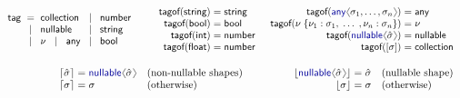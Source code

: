 \documentclass[10pt,preprint,clearpagebib]{sigplanconf}
\newcommand{\langl}{\begin{picture}(4.5,7)
\put(1.1,2.5){\rotatebox{60}{\line(1,0){5.5}}}
\put(1.1,2.5){\rotatebox{300}{\line(1,0){5.5}}}
\end{picture}}
\newcommand{\rangl}{\begin{picture}(4.5,7)
\put(.9,2.5){\rotatebox{120}{\line(1,0){5.5}}}
\put(.9,2.5){\rotatebox{240}{\line(1,0){5.5}}}
\end{picture}}
\newcommand{\kvd}[1]{\textnormal{\textcolor{kvdclr}{\sffamily #1}}}
\newcommand{\ident}[1]{\textnormal{\sffamily #1}}
\newcommand{\lsep}[0]{\;\; | \;\;}
\newcommand{\narrow}[1]{\hspace{-0.7em} #1 \hspace{-0.7em}}
\newcommand{\tytag}{\ident{tag}}
\newcommand{\dropopt}[1]{\lfloor#1\rfloor}
\newcommand{\addopt}[1]{\lceil#1\rceil}
\newcommand{\tytagof}{\ident{tagof}}
\begin{document}

\begin{figure}[t]
\noindent
\begin{equation*}
\begin{array}{rclcl}
 \tytag &\narrow{=}& \ident{collection}  &\narrow{\lsep}& \ident{number} \\
        &\narrow{\lsep}& \ident{nullable} &\narrow{\lsep}& \ident{string}  \\
        &\narrow{\lsep}& \nu ~\lsep \ident{any} &\narrow{\lsep}& \ident{bool}
\end{array}
%
\quad\;\;\;
%
\begin{array}{rcl}
 \tytagof(\ident{string}) &\narrow{=}& \ident{string}\\
 \tytagof(\ident{bool}) &\narrow{=}& \ident{bool}\\
 \tytagof(\ident{int}) &\narrow{=}& \ident{number}\\
 \tytagof(\ident{float}) &\narrow{=}& \ident{number}\\
\end{array}
%
\;\;
%
\begin{array}{rcl}
 \tytagof(\kvd{any}\langl\sigma_1, \ldots, \sigma_n\rangl) &\narrow{=}& \ident{any}\\
 \tytagof(\nu\; \{ \nu_1 : \sigma_1, \; \ldots \; , \nu_n : \sigma_n \}) &\narrow{=}& \nu \\
 \tytagof(\kvd{nullable}\langl\hat{\sigma}\rangl) &\narrow{=}& \ident{nullable}\\
 \tytagof([\sigma]) &\narrow{=}& \ident{collection}\\
\end{array}
\end{equation*}

\vspace{-0.5em}
\begin{equation*}
\quad\qquad\qquad
\begin{array}{rcll}
 \addopt{\hat{\sigma}} &\narrow{=}& \kvd{nullable}\langl\hat{\sigma}\rangl &(\textnormal{non-nullable shapes})\\
 \addopt{\sigma} &\narrow{=}& \sigma &(\textnormal{otherwise})
\end{array}
\qquad\qquad
\begin{array}{rcll}
 \dropopt{\kvd{nullable}\langl\hat{\sigma}\rangl} &\narrow{=}& \hat{\sigma} &(\textnormal{nullable shape})\\
 \dropopt{\sigma} &\narrow{=}& \sigma &(\textnormal{otherwise})
\end{array}
\end{equation*}


\end{figure}
\end{document}
